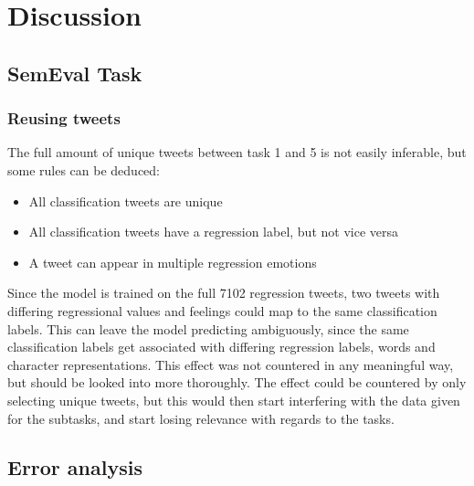 
\section{Discussion}

\subsection{SemEval Task}
\subsubsection{Reusing tweets} \label{sec:tweetreuse}
The full amount of unique tweets between task 1 and 5 is not easily inferable, but some rules can be deduced:\\
\begin{itemize}
\item All classification tweets are unique
\item All classification tweets have a regression label, but not vice versa
\item A tweet can appear in multiple regression emotions
\end{itemize}
Since the model is trained on the full 7102 regression tweets, two tweets with differing regressional values and feelings could map to the same classification labels. This can leave the model predicting ambiguously, since the same classification labels get associated with differing regression labels, words and character representations. This effect was not countered in any meaningful way, but should be looked into more thoroughly. The effect could be countered by only selecting unique tweets, but this would then start interfering with the data given for the subtasks, and start losing relevance with regards to the tasks. 

\subsection{Error analysis}

